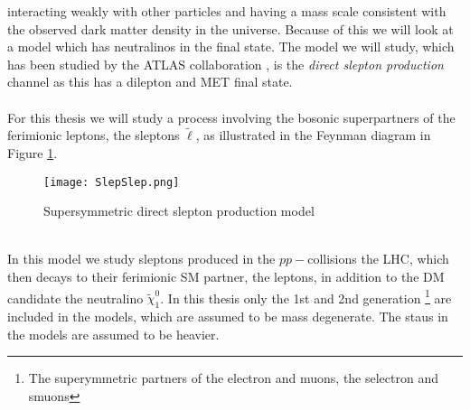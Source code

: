 \documentclass[12pt, a4paper]{book}
\begin{document}
interacting weakly with other particles and having a mass scale consistent with the observed dark matter density in the universe. Because of this we will look at a model which has neutralinos in the final state. The model we will study, 
which has been studied by the ATLAS collaboration \cite{ATLAS:2022hbt}, is the \textit{direct slepton production} channel as this has a dilepton and MET final state.\\
\\For this thesis we will study a process involving the bosonic superpartners of the ferimionic leptons, the sleptons $\tilde{\ell}$, as illustrated in the Feynman diagram in Figure \ref{fig:SlepSlep}.
\graphicspath{{../../figures/}}
\begin{figure}[!ht]
    \centering
    \texttt{[image: SlepSlep.png]}
    \caption{Supersymmetric direct slepton production model}\label{fig:SlepSlep}
\end{figure}
\\In this model we study sleptons produced in the $pp-$collisions the LHC, which then decays to their ferimionic SM partner, the leptons, in addition to the DM candidate the neutralino $\tilde{\chi}_1^0$. In this thesis only the 1st and 2nd generation \footnote{The superymmetric partners of the electron and muons, the selectron and smuons} are included in the models, which are assumed to be mass degenerate. 
The staus in the models are assumed to be heavier.

\newpage
\end{document}
